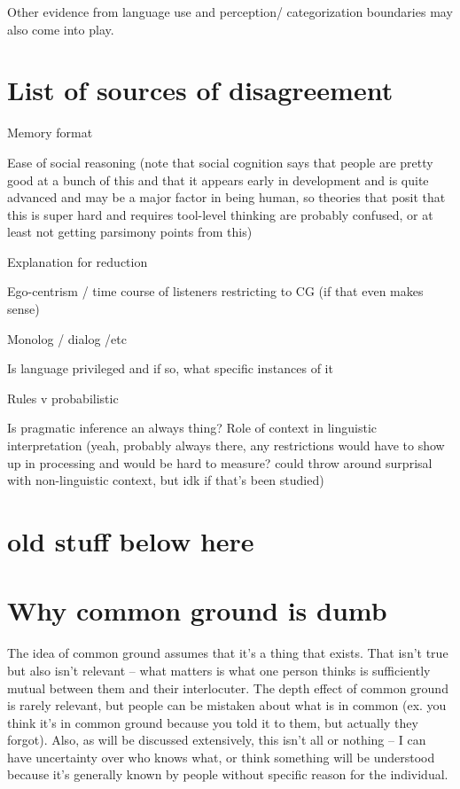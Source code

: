 \documentclass[]{article}
\begin{document}
Other evidence from language use and perception/ categorization boundaries may also come into play. 


\section{List of sources of disagreement}

Memory format 

Ease of social reasoning (note that social cognition says that people are pretty good at a bunch of this and that it appears early in development and is quite advanced and may be a major factor in being human, so theories that posit that this is super hard and requires tool-level thinking are probably confused, or at least not getting parsimony points from this)

Explanation for reduction

Ego-centrism / time course of listeners restricting to CG (if that even makes sense)

Monolog / dialog /etc 

Is language privileged and if so, what specific instances of it

Rules v probabilistic

Is pragmatic inference an always thing? Role of context in linguistic interpretation (yeah, probably always there, any restrictions would have to show up in processing and would be hard to measure? could throw around surprisal with non-linguistic context, but idk if that's been studied) 









\section{old stuff below here}





\section{Why common ground is dumb}

The idea of common ground assumes that it's a thing that exists. That isn't true but also isn't relevant -- what matters is what one person thinks is sufficiently mutual between them and their interlocuter. The depth effect of common ground is rarely relevant, but people can be mistaken about what is in common (ex. you think it's in common ground because you told it to them, but actually they forgot). Also, as will be discussed extensively, this isn't all or nothing -- I can have uncertainty over who knows what, or think something will be understood because it's generally known by people without specific reason for the individual. 
\end{document}
